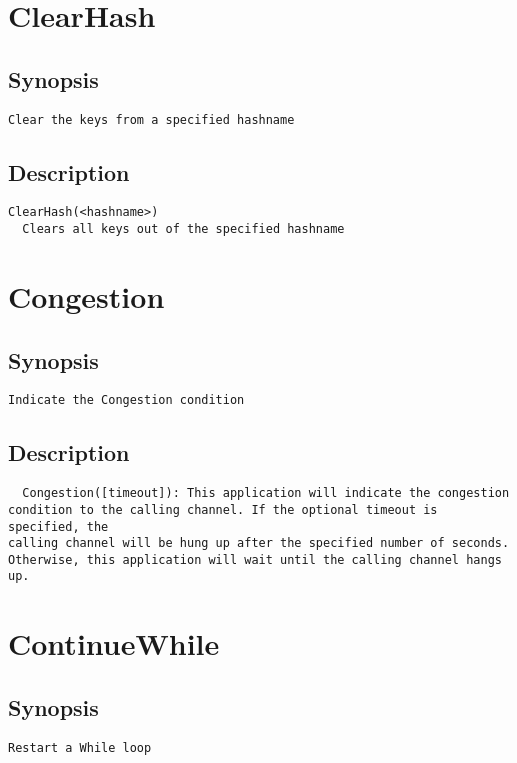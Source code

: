 \section{ClearHash}
\subsection{Synopsis}
\begin{verbatim}
Clear the keys from a specified hashname
\end{verbatim}
\subsection{Description}
\begin{verbatim}
ClearHash(<hashname>)
  Clears all keys out of the specified hashname

\end{verbatim}


\section{Congestion}
\subsection{Synopsis}
\begin{verbatim}
Indicate the Congestion condition
\end{verbatim}
\subsection{Description}
\begin{verbatim}
  Congestion([timeout]): This application will indicate the congestion
condition to the calling channel. If the optional timeout is specified, the
calling channel will be hung up after the specified number of seconds.
Otherwise, this application will wait until the calling channel hangs up.

\end{verbatim}


\section{ContinueWhile}
\subsection{Synopsis}
\begin{verbatim}
Restart a While loop
\end{verbatim}
